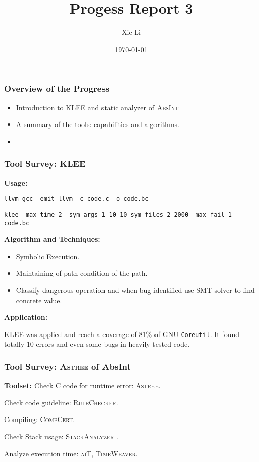 \documentclass[11pt]{beamer}
\title{Progess Report 3}
\date{\today}
\author{Xie Li}
\begin{document}
\maketitle

\begin{frame}\frametitle{Overview of the Progress}
\begin{itemize}

\item Introduction to \textsc{KLEE} and static analyzer of \textsc{AbsInt}

\item A summary of the tools: capabilities and algorithms.

\item 
\end{itemize}

\end{frame}

\begin{frame}\frametitle{Tool Survey: \textsc{KLEE}}

\textbf{Usage: }

\texttt{llvm-gcc --emit-llvm -c code.c -o code.bc}


\texttt{klee --max-time 2 --sym-args 1 10 10--sym-files 2 2000 --max-fail 1 code.bc}

\textbf{Algorithm and Techniques:}

\begin{itemize}
\item Symbolic Execution.\\
\item Maintaining of path condition of the path.

\item Classify dangerous operation and when bug identified use SMT solver to find concrete value.
\end{itemize}

\textbf{Application:}

KLEE was applied and reach a coverage of 81\% of GNU \texttt{Coreutil}. It found totally 10 errors and even some bugs in heavily-tested code.
\end{frame}

\begin{frame}\frametitle{Tool Survey: \textsc{Astree} of AbsInt}
\textbf{Toolset:}
Check C code for runtime error: \textsc{Astree}.

Check code guideline: \textsc{RuleChecker}.

Compiling: \textsc{CompCert}.

Check Stack usage: \textsc{StackAnalyzer} 
.

Analyze execution time: \textsc{aiT, TimeWeaver}.

\end{frame}
\end{document}
